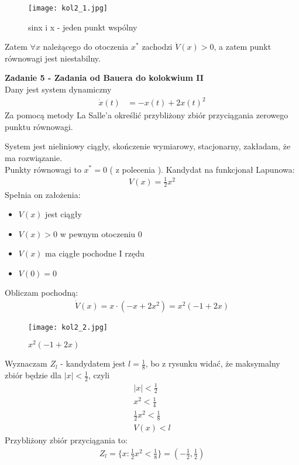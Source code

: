 \documentclass[a4paper,11pt]{article}
\begin{document}
\begin{figure}[H]
\centerline{\texttt{[image: kol2\_1.jpg]}}
\caption{sinx i x - jeden punkt wspólny}
\label{fig:kol2_1}
\end{figure}
Zatem \( \forall x \) należącego do otoczenia \( x^{*} \) zachodzi \( \dot{V}(x)>0  \), a zatem punkt równowagi jest niestabilny. 

\newpage
\begin{framed}
\textbf{Zadanie 5 - Zadania od Bauera do kolokwium II } \\ 
Dany jest system dynamiczny 
\begin{align*}
\dot{x}(t)&=-x(t)+2x(t)^{2}
\end{align*}
Za pomocą metody La Salle'a określić przybliżony zbiór przyciągania zerowego punktu równowagi. 
\end{framed}
System jest nieliniowy ciągły, skończenie wymiarowy, stacjonarny, zakładam, że ma rozwiązanie.\\
Punkty równowagi to \( x^{*} = 0 \) ( z polecenia ). 
Kandydat na funkcjonał Lapunowa: \\
\begin{align*}
V(x)=\frac{1}{2}x^{2}
\end{align*}
Spełnia on założenia: \\
\begin{itemize}
\item \( V(x) \) jest ciągły 
\item \( V(x)>0 \) w pewnym otoczeniu \( 0 \)
\item \( V(x) \) ma ciągłe pochodne I rzędu
\item \( V(0) = 0 \) 
\end{itemize}
Obliczam pochodną: \\ 
\begin{align*}
\dot{V}(x)=x \cdot ( -x+2x^{2} ) = x^{2}(-1+2x)  
\end{align*}
\begin{figure}[H]
\centerline{\texttt{[image: kol2\_2.jpg]}}
\caption{$ x^{2}(-1+2x) $}
\label{fig:kol2_1}
\end{figure}
Wyznaczam \( Z_{l} \) - kandydatem jest \( l = \frac{1}{8} \), bo z rysunku widać, że maksymalny zbiór będzie dla \( |x|<\frac{1}{2} \), czyli \\
\begin{align*}
|x|<\frac{1}{2} \\
x^{2} < \frac{1}{4} \\
\frac{1}{2} x^{2} < \frac{1}{8} \\
V(x) < l 
\end{align*}
Przybliżony zbiór przyciągania to: \\
\begin{align*}
Z_{l} = \{ x: \frac{1}{2}x^{2} < \frac{1}{8} \} = ( -\frac{1}{2} , \frac{1}{2} )
\end{align*}
\end{document}
